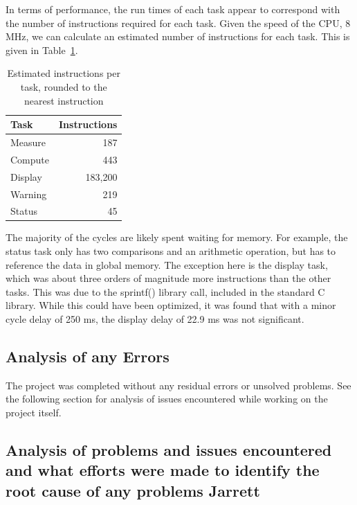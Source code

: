 \documentclass[12pt]{article} %
\begin{document}
In terms of performance, the run times of each task appear to correspond with
the number of instructions required for each task.  Given the speed of the CPU,
8 MHz, we can calculate an estimated number of instructions for each task.
This is given in Table~\ref{tab:instr}.
\begin{table}[h]
	\centering
	\begin{tabular}{|l|r|} 
		\hline
		Task & Instructions \\ \hline
		Measure & 187 \\ \hline
		Compute & 443 \\ \hline
		Display & 183,200 \\ \hline
		Warning & 219	\\ \hline
		Status & 45	\\ \hline
	\end{tabular}
	\caption{Estimated instructions per task, rounded to the nearest instruction}
  \label{tab:instr}
\end{table}
The majority of the cycles are likely spent waiting for memory.  For example,
the status task only has two comparisons and an arithmetic operation, but has
to reference the data in global memory.  The exception here is the display
task, which was about three orders of magnitude more instructions than the
other tasks.  This was due to the sprintf() library call, included in the
standard C library.  While this could have been optimized, it was found that
with a minor cycle delay of 250 ms, the display delay of 22.9 ms was not
significant.


\subsection{Analysis of any Errors}
The project was completed without any residual errors or unsolved problems. See the following section for analysis of issues encountered while working on the project itself.

\subsection{Analysis of problems and issues encountered and what efforts were made to identify the root cause of any problems  Jarrett}

\end{document}
